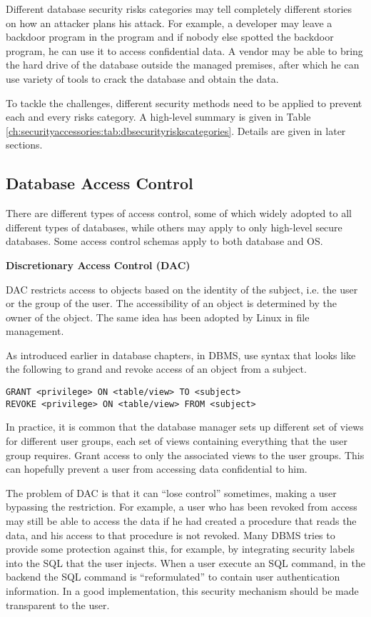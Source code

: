 Different database security risks categories may tell completely different stories on how an attacker plans his attack. For example, a developer may leave a backdoor program in the program and if nobody else spotted the backdoor program, he can use it to access confidential data. A vendor may be able to bring the hard drive of the database outside the managed premises, after which he can use variety of tools to crack the database and obtain the data.

To tackle the challenges, different security methods need to be applied to prevent each and every risks category. A high-level summary is given in Table \ref{ch:securityaccessories:tab:dbsecurityriskscategories}. Details are given in later sections.

\subsection{Database Access Control}

There are different types of access control, some of which widely adopted to all different types of databases, while others may apply to only high-level secure databases. Some access control schemas apply to both database and OS.

\vspace{0.1in}
\noindent \textbf{Discretionary Access Control (DAC)}
\vspace{0.1in}

DAC restricts access to objects based on the identity of the subject, i.e. the user or the group of the user. The accessibility of an object is determined by the owner of the object. The same idea has been adopted by Linux in file management.

As introduced earlier in database chapters, in DBMS, use syntax that looks like the following to grand and revoke access of an object from a subject.
\begin{lstlisting}
GRANT <privilege> ON <table/view> TO <subject>
REVOKE <privilege> ON <table/view> FROM <subject>
\end{lstlisting}
In practice, it is common that the database manager sets up different set of views for different user groups, each set of views containing everything that the user group requires. Grant access to only the associated views to the user groups. This can hopefully prevent a user from accessing data confidential to him.

The problem of DAC is that it can ``lose control'' sometimes, making a user bypassing the restriction. For example, a user who has been revoked from access may still be able to access the data if he had created a procedure that reads the data, and his access to that procedure is not revoked. Many DBMS tries to provide some protection against this, for example, by integrating security labels into the SQL that the user injects. When a user execute an SQL command, in the backend the SQL command is ``reformulated'' to contain user authentication information. In a good implementation, this security mechanism should be made transparent to the user.

